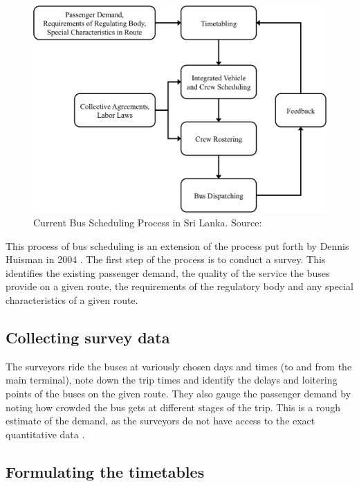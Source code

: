 \begin{figure}[h!]
\centering
\includegraphics [scale=0.7] {currentBusSchedulingProcess}
\caption[Current Bus Scheduling Process in SL]{Current Bus Scheduling Process in Sri Lanka. Source: \cite{Piyadasa2005}}
\label{image-currentBusSchedulingProcess}
\end{figure}

This process of bus scheduling is an extension of the process put forth by Dennis Huisman in 2004 \cite{Piyadasa2005}. The first step of the process is to conduct a survey. This identifies the existing passenger demand, the quality of the service the buses provide on a given route, the requirements of the regulatory body and any special characteristics of a given route. 

\subsection{Collecting survey data}

The surveyors ride the buses at variously chosen days and times (to and from the main terminal), note down the trip times and identify the delays and loitering points of the buses on the given route. They also gauge the passenger demand by noting how crowded the bus gets at different stages of the trip. This is a rough estimate of the demand, as the surveyors do not have access to the exact quantitative data \cite{Mahesh2013a, Theja2013a, Mahesh2013b, Navaratne2013a, Navaratne2013b}.

\subsection{Formulating the timetables}

